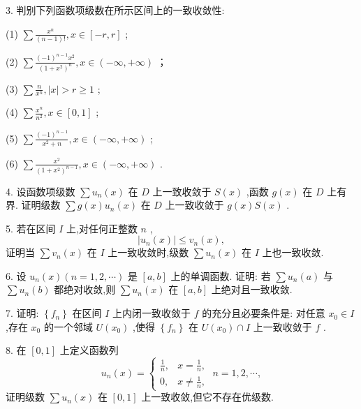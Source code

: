 3. 判别下列函数项级数在所示区间上的一致收敛性:

(1) \(\sum \frac{{x}^{n}}{\left( {n - 1}\right) !},x \in  \left\lbrack  {-r,r}\right\rbrack\) ;

(2) \(\sum \frac{{\left( -1\right) }^{n - 1}{x}^{2}}{{\left( 1 + {x}^{2}\right) }^{n}},x \in  \left( {-\infty , + \infty }\right)\) ；

(3) \(\sum \frac{n}{{x}^{n}},\left| x\right|  > r \geq  1\) ;

(4) \(\sum \frac{{x}^{n}}{{n}^{2}},x \in  \left\lbrack  {0,1}\right\rbrack\) ;

(5) \(\sum \frac{{\left( -1\right) }^{n - 1}}{{x}^{2} + n},x \in  \left( {-\infty , + \infty }\right)\) ;

(6) \(\sum \frac{{x}^{2}}{{\left( 1 + {x}^{2}\right) }^{n - 1}},x \in  \left( {-\infty , + \infty }\right)\) .

4. 设函数项级数 \(\sum {u}_{n}\left( x\right)\) 在 \(D\) 上一致收敛于 \(S\left( x\right)\) ,函数 \(g\left( x\right)\) 在 \(D\) 上有界. 证明级数 \(\sum g\left( x\right) {u}_{n}\left( x\right)\) 在 \(D\) 上一致收敛于 \(g\left( x\right) S\left( x\right)\) .

5. 若在区间 \(I\) 上,对任何正整数 \(n\) ,
\[
\left| {{u}_{n}\left( x\right) }\right|  \leq  {v}_{n}\left( x\right) ,
\]
证明当 \(\sum {v}_{n}\left( x\right)\) 在 \(I\) 上一致收敛时,级数 \(\sum {u}_{n}\left( x\right)\) 在 \(I\) 上也一致收敛.

6. 设 \({u}_{n}\left( x\right) \left( {n = 1,2,\cdots }\right)\) 是 \(\left\lbrack  {a,b}\right\rbrack\) 上的单调函数. 证明: 若 \(\sum {u}_{n}\left( a\right)\) 与 \(\sum {u}_{n}\left( b\right)\) 都绝对收敛,则 \(\sum {u}_{n}\left( x\right)\) 在 \(\left\lbrack  {a,b}\right\rbrack\) 上绝对且一致收敛.

7. 证明: \(\left\{  {f}_{n}\right\}\) 在区间 \(I\) 上内闭一致收敛于 \(f\) 的充分且必要条件是: 对任意 \({x}_{0} \in  I\) ,存在 \({x}_{0}\) 的一个邻域 \(U\left( {x}_{0}\right)\) ,使得 \(\left\{  {f}_{n}\right\}\) 在 \(U\left( {x}_{0}\right)  \cap  I\) 上一致收敛于 \(f\) .

8. 在 \(\left\lbrack  {0,1}\right\rbrack\) 上定义函数列
\[
{u}_{n}\left( x\right)  = \left\{  {\begin{array}{ll} \frac{1}{n}, & x = \frac{1}{n}, \\  0, & x \neq  \frac{1}{n}, \end{array}\;n = 1,2,\cdots ,}\right.
\]
证明级数 \(\sum {u}_{n}\left( x\right)\) 在 \(\left\lbrack  {0,1}\right\rbrack\) 上一致收敛,但它不存在优级数.

